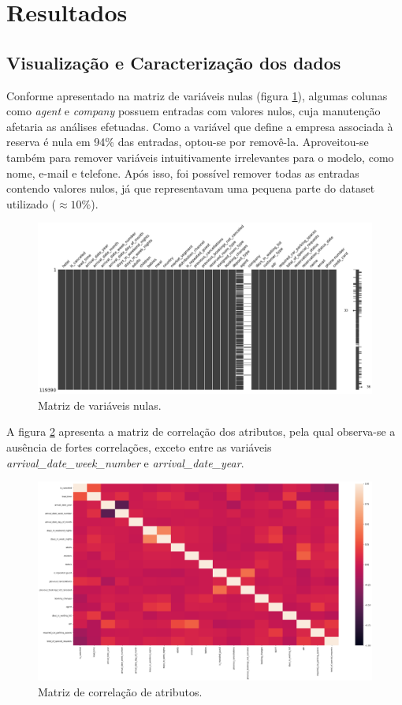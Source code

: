 \documentclass{homework}
\begin{document}
\section{Resultados}
\label{resultados}

\subsection{Visualização e Caracterização dos dados}

Conforme apresentado na matriz de variáveis nulas (figura \ref{null_matrix}), algumas colunas como \textit{agent} e
\textit{company} possuem entradas com valores nulos, cuja manutenção afetaria as análises efetuadas. Como a variável que
define a empresa associada à reserva é nula em 94\% das entradas, optou-se por removê-la. Aproveitou-se também para
remover variáveis intuitivamente irrelevantes para o modelo, como nome, e-mail e telefone. Após isso, foi possível
remover todas as entradas contendo valores nulos, já que representavam uma pequena parte do dataset utilizado
($\approx10\%$).

\begin{figure}[h!]
    \centerline{\includegraphics[scale=0.3]{null_matrix.png}}
    \caption{Matriz de variáveis nulas.}
    \label{null_matrix}
\end{figure}

A figura \ref{heatmap} apresenta a matriz de correlação dos atributos, pela qual observa-se a
ausência de fortes correlações, exceto entre as variáveis \textit{arrival\_date\_week\_number} e
\textit{arrival\_date\_year}.

\begin{figure}[h!]
    \centerline{\includegraphics[scale=0.25]{heatmap.png}}
    \caption{Matriz de correlação de atributos.}
    \label{heatmap}
\end{figure}
\end{document}
